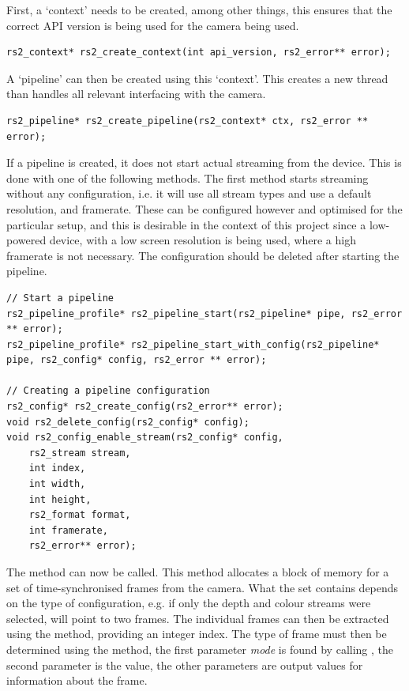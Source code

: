     First, a `context' needs to be created, among other things, this ensures that the correct API version is being used for the camera being used.
    \begin{lstlisting}[style=CStyle]
rs2_context* rs2_create_context(int api_version, rs2_error** error);\end{lstlisting}

    A `pipeline' can then be created using this `context'. This creates a new thread than handles all relevant interfacing with the camera.

    \begin{lstlisting}[style=CStyle]
rs2_pipeline* rs2_create_pipeline(rs2_context* ctx, rs2_error ** error);\end{lstlisting}   

    If a pipeline is created, it does not start actual streaming from the device. This is done with one of the following methods. The first method starts streaming without any configuration, i.e. it will use all stream types and use a default resolution, and framerate. These can be configured however and optimised for the particular setup, and this is desirable in the context of this project since a low-powered device, with a low screen resolution is being used, where a high framerate is not necessary. The configuration should be deleted after starting the pipeline.

    \begin{lstlisting}[style=CStyle]
// Start a pipeline
rs2_pipeline_profile* rs2_pipeline_start(rs2_pipeline* pipe, rs2_error ** error);
rs2_pipeline_profile* rs2_pipeline_start_with_config(rs2_pipeline* pipe, rs2_config* config, rs2_error ** error);

// Creating a pipeline configuration
rs2_config* rs2_create_config(rs2_error** error);
void rs2_delete_config(rs2_config* config);
void rs2_config_enable_stream(rs2_config* config,
    rs2_stream stream,
    int index,
    int width,
    int height,
    rs2_format format,
    int framerate,
    rs2_error** error);\end{lstlisting}

    The  method can now be called. This method allocates a block of memory for a set of time-synchronised frames from the camera. What the set contains depends on the type of configuration, e.g. if only the depth and colour streams were selected,  will point to two frames. The individual frames can then be extracted using the  method, providing an integer index. The type of frame must then be determined using the  method, the first parameter {\slshape mode} is found by calling , the second parameter is the  value, the other parameters are output values for information about the frame.

